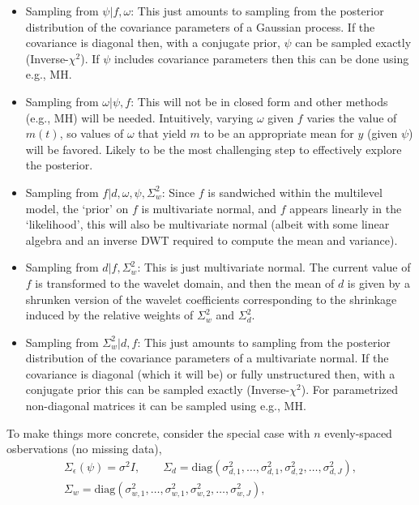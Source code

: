 \documentclass[a4paper,11pt]{article}
\begin{document}
\begin{itemize}
\item Sampling from $\psi|f,\omega$: This just amounts to sampling from the posterior distribution of the covariance parameters of a Gaussian process. If the covariance is diagonal then, with a conjugate prior, $\psi$ can be sampled exactly (Inverse-$\chi^{2}$). If $\psi$ includes covariance parameters then this can be done using e.g., MH. 
\item Sampling from $\omega|\psi,f$: This will not be in closed form and other methods (e.g., MH) will be needed. Intuitively, varying $\omega$ given $f$ varies the value of $m(t)$, so values of $\omega$ that yield $m$ to be an appropriate mean for $y$ (given $\psi$) will be favored. Likely to be the most challenging step to effectively explore the posterior.
\item Sampling from $f|d,\omega,\psi,\Sigma^{2}_{w}$: Since $f$ is sandwiched within the multilevel model, the \lq{}prior\rq{} on $f$ is multivariate normal, and $f$ appears linearly in the \lq{}likelihood\rq{}, this will also be multivariate normal (albeit with some linear algebra and an inverse DWT required to compute the mean and variance). 
\item Sampling from $d|f,\Sigma^{2}_{w}$: This is just multivariate normal. The current value of $f$ is transformed to the wavelet domain, and then the mean of $d$ is given by a shrunken version of the wavelet coefficients corresponding to the shrinkage induced by the relative weights of $\Sigma^{2}_{w}$ and $\Sigma^{2}_{d}$. 
\item Sampling from $\Sigma^{2}_{w}|d,f$: This just amounts to sampling from the posterior distribution of the covariance parameters of a multivariate normal. If the covariance is diagonal (which it will be) or fully unstructured then, with a conjugate prior this can be sampled exactly (Inverse-$\chi^{2}$). For parametrized non-diagonal matrices it can be sampled using e.g., MH.
\end{itemize}
To make things more concrete, consider the special case with $n$ evenly-spaced osbervations (no missing data), 
\begin{gather*}
 \Sigma_{\epsilon}(\psi) = \sigma^{2}I , \qquad \Sigma_{d} = \textrm{diag}\left(\sigma^{2}_{d,1},\ldots,\sigma^{2}_{d,1},\sigma^{2}_{d,2},\ldots,\sigma^{2}_{d,J}\right) , \\
 \Sigma_{w} = \textrm{diag}\left(\sigma^{2}_{w,1},\ldots,\sigma^{2}_{w,1},\sigma^{2}_{w,2},\ldots,\sigma^{2}_{w,J}\right) ,
\end{gather*}
\end{document}
